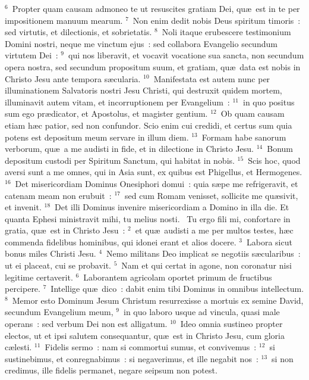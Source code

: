 ${}^{6}$~Propter quam causam admoneo te ut resuscites gratiam Dei, qu\ae\ est in te per impositionem manuum mearum.
${}^{7}$~Non enim dedit nobis Deus spiritum timoris~: sed virtutis, et dilectionis, et sobrietatis.
${}^{8}$~Noli itaque erubescere testimonium Domini nostri, neque me vinctum ejus~: sed collabora Evangelio secundum virtutem Dei~:
${}^{9}$~qui nos liberavit, et vocavit vocatione sua sancta, non secundum opera nostra, sed secundum propositum suum, et gratiam, qu\ae\ data est nobis in Christo Jesu ante tempora s\ae cularia.
${}^{10}$~Manifestata est autem nunc per illuminationem Salvatoris nostri Jesu Christi, qui destruxit quidem mortem, illuminavit autem vitam, et incorruptionem per Evangelium~:
${}^{11}$~in quo positus sum ego pr\ae dicator, et Apostolus, et magister gentium.
${}^{12}$~Ob quam causam etiam h\ae c patior, sed non confundor. Scio enim cui credidi, et certus sum quia potens est depositum meum servare in illum diem.
${}^{13}$~Formam habe sanorum verborum, qu\ae\ a me audisti in fide, et in dilectione in Christo Jesu.
${}^{14}$~Bonum depositum custodi per Spiritum Sanctum, qui habitat in nobis.
${}^{15}$~Scis hoc, quod aversi sunt a me omnes, qui in Asia sunt, ex quibus est Phigellus, et Hermogenes.
${}^{16}$~Det misericordiam Dominus Onesiphori domui~: quia s\ae pe me refrigeravit, et catenam meam non erubuit~:
${}^{17}$~sed cum Romam venisset, sollicite me qu\ae sivit, et invenit.
${}^{18}$~Det illi Dominus invenire misericordiam a Domino in illa die. Et quanta Ephesi ministravit mihi, tu melius nosti.
~\lettrine[lines=10,image=true,loversize=0.05,lraise=-0.03]{T}{}u ergo fili mi, confortare in gratia, qu\ae\ est in Christo Jesu~:
${}^{2}$~et qu\ae\ audisti a me per multos testes, h\ae c commenda fidelibus hominibus, qui idonei erant et alios docere.
${}^{3}$~Labora sicut bonus miles Christi Jesu.
${}^{4}$~Nemo militans Deo implicat se negotiis s\ae cularibus~: ut ei placeat, cui se probavit.
${}^{5}$~Nam et qui certat in agone, non coronatur nisi legitime certaverit.
${}^{6}$~Laborantem agricolam oportet primum de fructibus percipere.
${}^{7}$~Intellige qu\ae\ dico~: dabit enim tibi Dominus in omnibus intellectum.
${}^{8}$~Memor esto Dominum Jesum Christum resurrexisse a mortuis ex semine David, secundum Evangelium meum,
${}^{9}$~in quo laboro usque ad vincula, quasi male operans~: sed verbum Dei non est alligatum.
${}^{10}$~Ideo omnia sustineo propter electos, ut et ipsi salutem consequantur, qu\ae\ est in Christo Jesu, cum gloria c\ae lesti.
${}^{11}$~Fidelis sermo~: nam si commortui sumus, et convivemus~:
${}^{12}$~si sustinebimus, et conregnabimus~: si negaverimus, et ille negabit nos~:
${}^{13}$~si non credimus, ille fidelis permanet, negare seipsum non potest.


